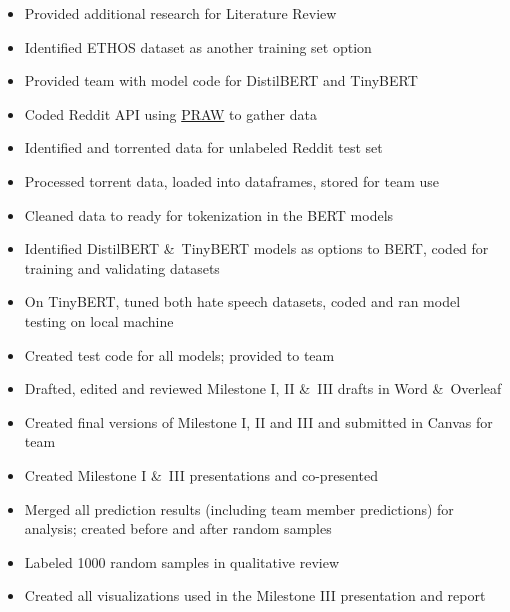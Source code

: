 \documentclass[conference]{IEEEtran}
\begin{document}
\begin{itemize}
   \item Provided additional research for Literature Review
   \item Identified ETHOS dataset as another training set option
   \item Provided team with model code for DistilBERT and TinyBERT 
   \item Coded Reddit API using \href{https://praw.readthedocs.io/en/stable/}{PRAW} to gather data 
   \item Identified and torrented data for unlabeled Reddit test set
   \item Processed torrent data, loaded into dataframes, stored for team use
   \item Cleaned data to ready for tokenization in the BERT models
   \item Identified DistilBERT \&\ TinyBERT models as options to BERT, coded for training and validating datasets 
   \item On TinyBERT, tuned both hate speech datasets, coded and ran model testing on local machine
   \item Created test code for all models; provided to team
   \item Drafted, edited and reviewed Milestone I, II \&\ III drafts in Word \&\ Overleaf 
   \item Created final versions of Milestone I, II and III and submitted in Canvas for team 
   \item Created Milestone I \&\ III presentations and co-presented  
   \item Merged all prediction results (including team member predictions) for analysis; created before and after random samples
   \item Labeled 1000 random samples in qualitative review
   \item Created all visualizations used in the Milestone III presentation and report
 \end{itemize}
\end{document}
